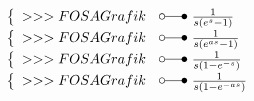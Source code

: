 \begin{footnotesize}
\[\begin{array}{@{}l@{ ~ \laplace ~ }l@{}}
\left\lbrace\begin{array}{l}
>>>FOSA Grafik \\
\end{array}\right. &
    \frac{1}{s (e^s - 1)} \\
\left\lbrace\begin{array}{l}
>>>FOSA Grafik \\
\end{array}\right. &
    \frac{1}{s (e^{as} - 1)} \\
\left\lbrace\begin{array}{l}
>>>FOSA Grafik \\
\end{array}\right. &
    \frac{1}{s (1 - e^{-s})} \\
\left\lbrace\begin{array}{l}
>>>FOSA Grafik \\
\end{array}\right. &
    \frac{1}{s (1 - e^{-as})} \\
\end{array} \]


\end{footnotesize}
